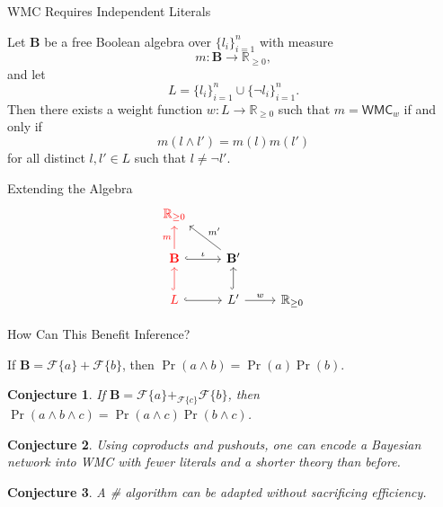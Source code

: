 \documentclass{beamer}
\newtheorem{conjecture}{Conjecture}
\begin{document}
\begin{frame}{WMC Requires Independent Literals}
  \begin{theorem}
    Let $\mathbf{B}$ be a free Boolean algebra over $\{ l_i \}_{i=1}^n$ with
    measure
    \[
      m\colon \mathbf{B} \to \mathbb{R}_{\ge 0},
    \]
    and let
    \[
      L = \{ l_i \}_{i = 1}^n \cup \{\neg l_i \}_{i = 1}^n.
    \]
    Then there exists a weight function $w\colon L \to \mathbb{R}_{\ge 0}$ such
    that $m = \mathsf{WMC}_w$ if and only if
    \[
      m(l \land l') = m(l)m(l')
    \]
    for all distinct $l, l' \in L$ such that $l \ne \neg l'$.
  \end{theorem}
\end{frame}

\begin{frame}[fragile]{Extending the Algebra}
  \[
    \begin{tikzcd}
      \textcolor{red}{\mathbb{R}_{\ge 0}} & & \\
      \textcolor{red}{\mathbf{B}} \arrow[red]{u}{m} \ar[r,hookrightarrow,"\iota"]
      & \mathbf{B'} \arrow{lu}[swap]{m'} & \\
      \textcolor{red}{L} \ar[u,red,hookrightarrow] \ar[r,hookrightarrow] & L'
      \ar[u,hookrightarrow] \arrow{r}{w} & \mathbb{R}_{\ge 0}
    \end{tikzcd}
  \]
\end{frame}

\begin{frame}{How Can This Benefit Inference?}
  \begin{theorem}
    If $\mathbf{B} = \mathcal{F}\{a\} + \mathcal{F}\{b\}$, then $\Pr(a \land b) =
    \Pr(a)\Pr(b)$.
  \end{theorem}
  \pause
  \begin{conjecture}
    If $\mathbf{B} = \mathcal{F}\{a\} +_{\mathcal{F}\{c\}} \mathcal{F}\{b\}$, then $\Pr(a
    \land b \land c) = \Pr(a \land c)\Pr(b \land c)$.
  \end{conjecture}
  \pause
  \begin{conjecture}
    Using coproducts and pushouts, one can encode a Bayesian network into WMC
    with \alert{fewer literals} and a \alert{shorter theory} than before.
  \end{conjecture}
  \pause
  \begin{conjecture}
    A \#\SAT{} algorithm can be adapted without sacrificing efficiency.
  \end{conjecture}
\end{frame}
\end{document}

